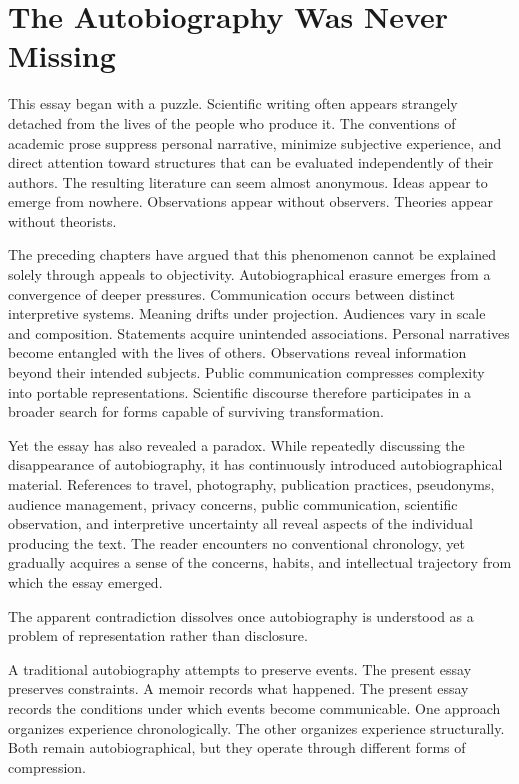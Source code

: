 \documentclass[11pt]{article}
\theoremstyle{plain}
\begin{document}
\section{The Autobiography Was Never Missing}

This essay began with a puzzle. Scientific writing often appears strangely detached from the lives of the people who produce it. The conventions of academic prose suppress personal narrative, minimize subjective experience, and direct attention toward structures that can be evaluated independently of their authors. The resulting literature can seem almost anonymous. Ideas appear to emerge from nowhere. Observations appear without observers. Theories appear without theorists.

The preceding chapters have argued that this phenomenon cannot be explained solely through appeals to objectivity. Autobiographical erasure emerges from a convergence of deeper pressures. Communication occurs between distinct interpretive systems. Meaning drifts under projection. Audiences vary in scale and composition. Statements acquire unintended associations. Personal narratives become entangled with the lives of others. Observations reveal information beyond their intended subjects. Public communication compresses complexity into portable representations. Scientific discourse therefore participates in a broader search for forms capable of surviving transformation.

Yet the essay has also revealed a paradox. While repeatedly discussing the disappearance of autobiography, it has continuously introduced autobiographical material. References to travel, photography, publication practices, pseudonyms, audience management, privacy concerns, public communication, scientific observation, and interpretive uncertainty all reveal aspects of the individual producing the text. The reader encounters no conventional chronology, yet gradually acquires a sense of the concerns, habits, and intellectual trajectory from which the essay emerged.

The apparent contradiction dissolves once autobiography is understood as a problem of representation rather than disclosure.

A traditional autobiography attempts to preserve events. The present essay preserves constraints. A memoir records what happened. The present essay records the conditions under which events become communicable. One approach organizes experience chronologically. The other organizes experience structurally. Both remain autobiographical, but they operate through different forms of compression.
\end{document}
